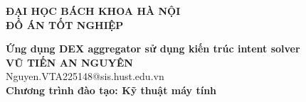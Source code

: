 \documentclass[DoAn.tex]{subfiles}
\begin{document}
\begin{titlepage}
\thispagestyle{empty}
\begin{center}

{\textbf{\large{ĐẠI HỌC BÁCH KHOA HÀ NỘI}}}\\[2cm]

{\textbf{\huge{ ĐỒ ÁN TỐT NGHIỆP}}}\\[0.6cm]
{\textbf{\Large{Ứng dụng DEX aggregator sử dụng kiến trúc intent solver}}\\[0.6cm]

{\textbf{\large{VŨ TIẾN AN NGUYÊN}}}\\
{\large{Nguyen.VTA225148@sis.hust.edu.vn}}\\[0.5cm]

{\textbf{\large{Chương trình đào tạo: Kỹ thuật máy tính
}}}\\

\vspace{1.8cm}
\begin{table}[H]
\centering
{}
\end{table}}
\end{center}



\end{titlepage}
\end{document}
